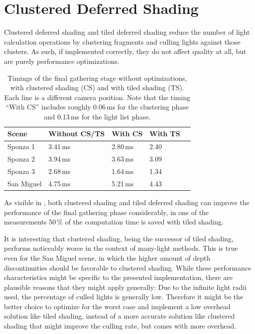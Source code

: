 \section{Clustered Deferred Shading}
\label{sec:results:clusteredShading}

Clustered deferred shading and tiled deferred shading reduce the number of light calculation operations by clustering fragments and culling lights against those clusters. As such, if implemented correctly, they do not affect quality at all, but are purely performance optimizations.

\begin{table}[h]
    \begin{center}
        \begin{tabulary}{0.98\textwidth}{| L | L | L | L | L |}
            \hline
            Scene & Without CS/TS & With CS & With TS \\ \hline
            Sponza 1 & 3.41\,ms & 2.80\,ms & 2.40\\
            Sponza 2 & 3.94\,ms & 3.63\,ms & 3.09\\
            Sponza 3 & 2.68\,ms & 1.64\,ms & 1.34\\
            San Miguel & 4.75\,ms & 5.21\,ms & 4.43\\
            \hline
        \end{tabulary}
        \caption{Timings of the final gathering stage without optimizations, with clustered shading (CS) and with tiled shading (TS). Each line is a different camera position. Note that the timing ``With CS'' includes roughly 0.06\,ms for the clustering phase and 0.13\,ms for the light list phase.}
        \label{tab:results:timings_clustered_shading}
    \end{center}
\end{table}

As visible in , both clustered shading and tiled deferred shading can improve the performance of the final gathering phase considerably, in one of the measurements 50\,\% of the computation time is saved with tiled shading.


It is interesting that clustered shading, being the successor of tiled shading, performs noticeably worse in the context of many-light methods. This is true even for the San Miguel scene, in which the higher amount of depth discontinuities should be favorable to clustered shading. While these performance characteristics might be specific to the presented implementation, there are plausible reasons that they might apply generally: Due to the infinite light radii used, the percentage of culled lights is generally low. Therefore it might be the better choice to optimize for the worst case and implement a low overhead solution like tiled shading, instead of a more accurate solution like clustered shading that might improve the culling rate, but comes with more overhead.

